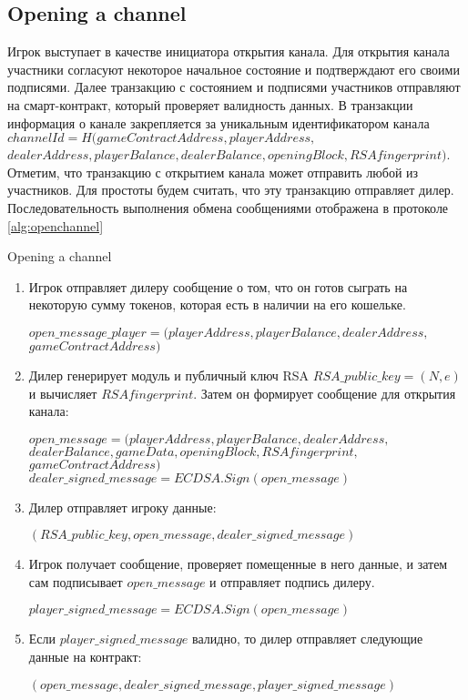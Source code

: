 		\subsection {Opening a channel}
Игрок выступает в качестве инициатора открытия канала. Для открытия канала участники согласуют некоторое начальное состояние и подтверждают его своими подписями. Далее транзакцию с состоянием и подписями участников отправляют на смарт-контракт, который проверяет валидность данных. В транзакции информация о канале закрепляется за уникальным идентификатором канала $channelId = H(gameContractAddress, playerAddress,$ \\ $dealerAddress, playerBalance, dealerBalance, openingBlock, RSAfingerprint)$. Отметим, что транзакцию с открытием канала может отправить любой из участников. Для простоты будем считать, что эту транзакцию отправляет дилер. Последовательность выполнения обмена сообщениями отображена в протоколе \autoref {alg:openchannel}
\begin{algorithm}
\caption{Opening a channel} \label{alg:openchannel}
\begin{enumerate}
	\item Игрок отправляет дилеру сообщение о том, что он готов сыграть на некоторую сумму токенов, которая есть в наличии на его кошельке.
\begin{center}
	 $open\_message\_player = (playerAddress, playerBalance, dealerAddress,$\\$ gameContractAddress)$
\end{center}
	\item Дилер генерирует модуль и публичный ключ RSA $RSA\_public\_key= (N,e)$ и вычисляет $RSAfingerprint$. Затем он формирует сообщение для открытия канала:
\begin{center}
	 $open\_message = (playerAddress,  playerBalance, dealerAddress,$\\$dealerBalance, gameData, openingBlock, RSAfingerprint,$\\$gameContractAddress)$
	$dealer\_signed\_message = ECDSA.Sign(open\_message)$
\end{center}
	\item Дилер отправляет игроку данные:
\begin{center}
$(RSA\_public\_key, open\_message,dealer\_signed\_message)$
\end{center}
	\item Игрок получает сообщение, проверяет помещенные в него данные, и затем сам подписывает $open\_message$ и отправляет подпись дилеру.
\begin{center}
	$player\_signed\_message = ECDSA.Sign(open\_message)$
\end{center}
	\item Если $player\_signed\_message$ валидно, то дилер отправляет следующие данные на контракт:
\begin{center}
$(open\_message,dealer\_signed\_message,player\_signed\_message)$
\end{center}
\end{enumerate}
\end{algorithm}

